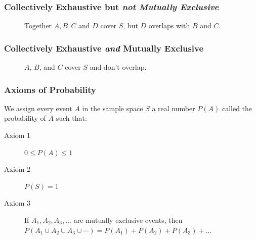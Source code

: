 \documentclass{beamer}
\begin{document}
\begin{frame}
\frametitle{Collectively Exhaustive but \emph{not Mutually Exclusive}}
\begin{figure}
\centering
{}
\caption{Together $A, B, C$ and $D$ cover $S$, but $D$ overlaps with $B$ and $C$.}
\end{figure}
\end{frame}

\begin{frame}
\frametitle{Collectively Exhaustive \emph{and} Mutually Exclusive}
\begin{figure}
\centering
{}
\caption{$A$, $B$, and $C$ cover $S$ and don't overlap.}
\end{figure}
\end{frame}


\begin{frame}
\frametitle{Axioms of Probability}
We assign every event $A$ in the sample space $S$ a real number $P(A)$ called the \alert{probability of $A$} such that: 
\vspace{1em}
\begin{description}
	\item[Axiom 1] $0 \leq P(A) \leq 1$
	\item[Axiom 2] $P(S)=1$
	\item[Axiom 3] If $A_1, A_2, A_3, \hdots$ are mutually exclusive events, then $P(A_1\cup A_2 \cup A_3 \cup \cdots) = P(A_1) + P(A_2) + P(A_3) + \hdots$
\end{description}

\end{frame}
\end{document}
